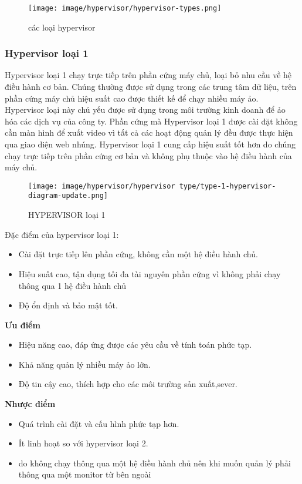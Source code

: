 \documentclass[a4paper,12pt]{article}
\begin{document}
\begin{figure}[h]
    \centering
    \texttt{[image: image/hypervisor/hypervisor-types.png]}
    \caption{các loại hypervisor}
    \label{}
\end{figure}

\subsubsection{Hypervisor loại 1}
Hypervisor loại 1 chạy trực tiếp trên phần cứng máy chủ, loại bỏ nhu cầu về hệ điều hành cơ bản. Chúng thường
được sử dụng trong các trung tâm dữ liệu, trên phần cứng máy chủ hiệu suất cao được thiết kế để chạy nhiều máy
ảo. Hypervisor loại này chủ yếu được sử dụng trong môi trường kinh doanh để ảo hóa các dịch vụ của công ty. Phần
cứng mà Hypervisor loại 1 được cài đặt không cần màn hình để xuất video vì tất cả các hoạt động quản lý đều được
thực hiện qua giao diện web nhúng. Hypervisor loại 1 cung cấp hiệu suất tốt hơn do chúng chạy trực tiếp trên phần
cứng cơ bản và không phụ thuộc vào hệ điều hành của máy chủ.


\begin{figure}[h]
    \centering
    \texttt{[image: image/hypervisor/hypervisor type/type-1-hypervisor-diagram-update.png]}
    \caption{HYPERVISOR loại 1}
    \label{}
\end{figure}




Đặc điểm của hypervisor loại 1:
\begin{itemize}
\item Cài đặt trực tiếp lên phần cứng, không cần một hệ điều hành chủ.
\item Hiệu suất cao, tận dụng tối đa tài nguyên phần cứng vì không phải chạy thông qua 1 hệ điều hành chủ
\item Độ ổn định và bảo mật tốt.
\end{itemize}

\textbf{Ưu điểm} 
\begin{itemize}
\item Hiệu năng cao, đáp ứng được các yêu cầu về tính toán phức tạp.
\item Khả năng quản lý nhiều máy ảo lớn.
\item Độ tin cậy cao, thích hợp cho các môi trường sản xuất,sever.
\end{itemize}

\textbf{Nhược điểm}
\begin{itemize}
\item Quá trình cài đặt và cấu hình phức tạp hơn.
\item Ít linh hoạt so với hypervisor loại 2.
\item do không chạy thông qua một hệ điều hành chủ nên khi muốn quản lý phải thông qua một monitor từ bên ngoài 
\end{itemize}
\end{document}
